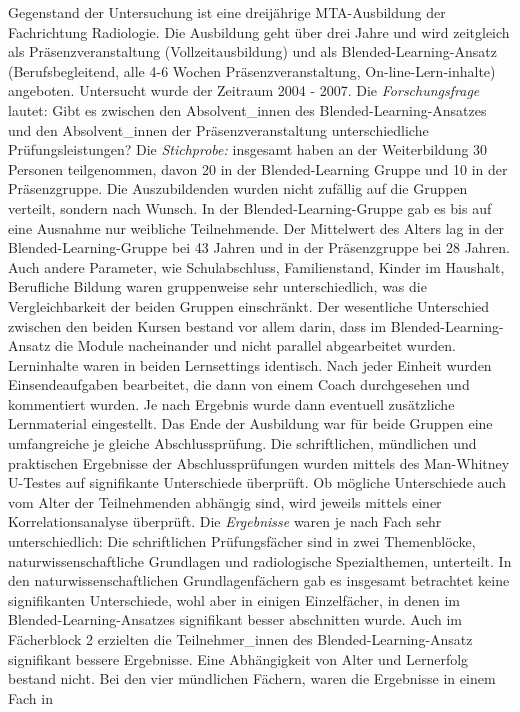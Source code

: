 Gegenstand der Untersuchung ist eine dreijährige MTA-Ausbildung der
Fachrichtung Radiologie. Die Ausbildung geht über drei Jahre und wird
zeitgleich als Präsenzveranstaltung (Vollzeitausbildung) und als
Blended-Learning-Ansatz (Berufsbegleitend, alle 4-6 Wochen
Präsenzveranstaltung, On-line-Lern-inhalte) angeboten. Untersucht wurde
der Zeitraum 2004 - 2007. Die \emph{Forschungsfrage} lautet: Gibt es
zwischen den Absolvent\_innen des Blended-Learning-Ansatzes und den
Absolvent\_innen der Präsenzveranstaltung unterschiedliche
Prüfungsleistungen? Die \emph{Stichprobe:} insgesamt haben an der
Weiterbildung 30 Personen teilgenommen, davon 20 in der Blended-Learning
Gruppe und 10 in der Präsenzgruppe. Die Auszubildenden wurden nicht
zufällig auf die Gruppen verteilt, sondern nach Wunsch. In der
Blended-Learning-Gruppe gab es bis auf eine Ausnahme nur weibliche
Teilnehmende. Der Mittelwert des Alters lag in der
Blended-Learning-Gruppe bei 43 Jahren und in der Präsenzgruppe bei 28
Jahren. Auch andere Parameter, wie Schulabschluss, Familienstand, Kinder
im Haushalt, Berufliche Bildung waren gruppenweise sehr unterschiedlich,
was die Vergleichbarkeit der beiden Gruppen einschränkt. Der wesentliche
Unterschied zwischen den beiden Kursen bestand vor allem darin, dass im
Blended-Learning-Ansatz die Module nacheinander und nicht parallel
abgearbeitet wurden. Lerninhalte waren in beiden Lernsettings identisch.
Nach jeder Einheit wurden Einsendeaufgaben bearbeitet, die dann von
einem Coach durchgesehen und kommentiert wurden. Je nach Ergebnis wurde
dann eventuell zusätzliche Lernmaterial eingestellt. Das Ende der
Ausbildung war für beide Gruppen eine umfangreiche je gleiche
Abschlussprüfung. Die schriftlichen, mündlichen und praktischen
Ergebnisse der Abschlussprüfungen wurden mittels des Man-Whitney
U-Testes auf signifikante Unterschiede überprüft. Ob mögliche
Unterschiede auch vom Alter der Teilnehmenden abhängig sind, wird
jeweils mittels einer Korrelationsanalyse überprüft. Die
\emph{Ergebnisse} waren je nach Fach sehr unterschiedlich: Die
schriftlichen Prüfungsfächer sind in zwei Themenblöcke,
naturwissenschaftliche Grundlagen und radiologische Spezialthemen,
unterteilt. In den naturwissenschaftlichen Grundlagenfächern gab es
insgesamt betrachtet keine signifikanten Unterschiede, wohl aber in
einigen Einzelfächer, in denen im Blended-Learning-Ansatzes signifikant
besser abschnitten wurde. Auch im Fächerblock 2 erzielten die
Teilnehmer\_innen des Blended-Learning-Ansatz signifikant bessere
Ergebnisse. Eine Abhängigkeit von Alter und Lernerfolg bestand nicht.
Bei den vier mündlichen Fächern, waren die Ergebnisse in einem Fach in
